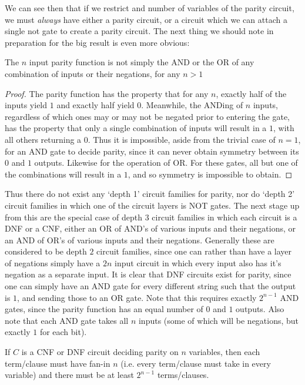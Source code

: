 We can see then that if we restrict and number of variables of the parity circuit, we must \textit{always} have either a parity circuit, or a circuit which we can attach a single not gate to create a parity circuit. The next thing we should note in preparation for the big result is even more obvious: 
\begin{fact}
	The $n$ input parity function is not simply the AND or the OR of any combination of inputs or their negations, for any $n>1$ 
\end{fact}
\begin{proof}
	The parity function has the property that for any $n$, exactly half of the inputs yield $1$ and exactly half yield $0$. Meanwhile, the ANDing of $n$ inputs, regardless of which ones may or may not be negated prior to entering the gate, has the property that only a single combination of inputs will result in a $1$, with all others returning a $0$. Thus it is impossible, aside from the trivial case of $n=1$, for an AND gate to decide parity, since it can never obtain symmetry between its $0$ and $1$ outputs. Likewise for the operation of OR. For these gates, all but one of the combinations will result in a $1$, and so symmetry is impossible to obtain. 
\end{proof}
Thus there do not exist any `depth 1' circuit families for parity, nor do `depth 2' circuit families in which one of the circuit layers is NOT gates. The next stage up from this are the special case of depth $3$ circuit families in which each circuit is a DNF or a CNF, either an OR of AND's of various inputs and their negations, or an AND of OR's of various inputs and their negations. Generally these are considered to be depth $2$ circuit families, since one can rather than have a layer of negations simply have a $2n$ input circuit in which every input also has it's negation as a separate input. It is clear that DNF circuits exist for parity, since one can simply have an AND gate for every different string such that the output is $1$, and sending those to an OR gate. Note that this requires exactly $2^{n-1}$ AND gates, since the parity function has an equal number of $0$ and $1$ outputs. Also note that each AND gate takes all $n$ inputs (some of which will be negations, but exactly $1$ for each bit). 
\begin{fact}
	If $C$ is a CNF or DNF circuit deciding parity on $n$ variables, then each term/clause must have fan-in $n$ (i.e. every term/clause must take in every variable) and there must be at least $2^{n-1}$ terms/clauses.
\end{fact}
